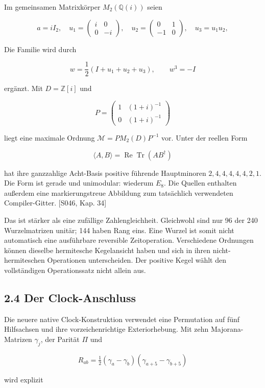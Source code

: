 Im gemeinsamen Matrixkörper \(M_2(\mathbb Q(i))\) seien

\[
a=iI_2,\quad
u_1=\begin{pmatrix}i&0\\0&-i\end{pmatrix},\quad
u_2=\begin{pmatrix}0&1\\-1&0\end{pmatrix},\quad
u_3=u_1u_2,
\]

Die Familie wird durch

\[w=\frac12(I+u_1+u_2+u_3),\qquad w^3=-I\]

ergänzt. Mit \(D=\mathbb Z[i]\) und

\[P=\begin{pmatrix}1&(1+i)^{-1}\\0&(1+i)^{-1}\end{pmatrix}\]

liegt eine maximale Ordnung \(\mathcal M=PM_2(D)P^{-1}\) vor. Unter der
reellen Form

\[\langle A,B\rangle=\operatorname{Re}\operatorname{Tr}(AB^\dagger)\]

hat ihre ganzzahlige Acht-Basis positive führende Hauptminoren
\(2,4,4,4,4,4,2,1\). Die Form ist gerade und unimodular: wiederum
\(E_8\). Die Quellen enthalten außerdem eine markierungstreue Abbildung
zum tatsächlich verwendeten Compiler-Gitter. {[}S046, Kap. 34{]}

Das ist stärker als eine zufällige Zahlengleichheit. Gleichwohl sind nur
96 der 240 Wurzelmatrizen unitär; 144 haben Rang eins. Eine Wurzel ist
somit nicht automatisch eine ausführbare reversible Zeitoperation.
Verschiedene Ordnungen können dieselbe hermitesche Kegelansicht haben
und sich in ihren nicht-hermiteschen Operationen unterscheiden. Der
positive Kegel wählt den vollständigen Operationssatz nicht allein aus.

\subsection{2.4 Der Clock-Anschluss}\label{der-clock-anschluss}

Die neuere native Clock-Konstruktion verwendet eine Permutation auf fünf
Hilfsachsen und ihre vorzeichenrichtige Exteriorhebung. Mit zehn
Majorana-Matrizen \(\gamma_j\), der Parität \(\Pi\) und

\[R_{ab}=\tfrac12(\gamma_a-\gamma_b)(\gamma_{a+5}-\gamma_{b+5})\]

wird explizit

